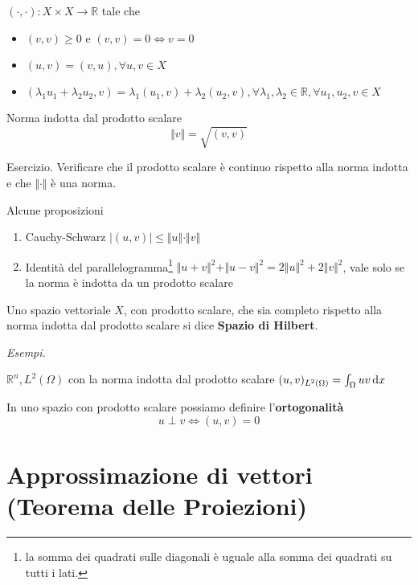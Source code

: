 \begin{definition}
     $(\cdotp,\cdotp) :X\times X\rightarrow \mathbb{R}$ tale che
    \begin{itemize}
        \item $(v,v) \geq 0$ e $(v,v) =0\Leftrightarrow v=0$
        \item $(u,v) =(v,u),\forall u,v\in X$
        \item $(\lambda _{1} u_{1} +\lambda _{2} u_{2},v) =\lambda _{1}(u_{1},v) +\lambda _{2}(u_{2},v),\forall \lambda _{1},\lambda _{2} \in \mathbb{R},\forall u_{1},u_{2},v\in X$
    \end{itemize}
\end{definition}
\begin{definition}
    Norma indotta dal prodotto scalare
    \begin{equation*}
        \Vert v\Vert =\sqrt{(v,v)}
    \end{equation*}
\end{definition}
Esercizio. Verificare che il prodotto scalare è continuo rispetto alla norma indotta e che $\Vert \cdotp \Vert $ è una norma.
\begin{theorem}
    Alcune proposizioni
    \begin{enumerate}
        \item Cauchy-Schwarz $| (u,v)| \leq \Vert u\Vert \cdotp \Vert v\Vert $
        \item Identità del parallelogramma\footnote{la somma dei quadrati sulle diagonali è uguale alla somma dei quadrati su tutti i lati.} $\Vert u+v\Vert ^{2} +\Vert u-v\Vert ^{2} =2\Vert u\Vert ^{2} +2\Vert v\Vert ^{2}$, vale solo se la norma è indotta da un prodotto scalare
    \end{enumerate}
\end{theorem}
\begin{definition}
    Uno spazio vettoriale $X$, con prodotto scalare, che sia completo rispetto alla norma indotta dal prodotto scalare si dice \textbf{Spazio di Hilbert}.
\end{definition}
\textit{Esempi.}

$\mathbb{R}^{n},L^{2}(\Omega)$ con la norma indotta dal prodotto scalare $(u,v)_{L^{2}(\Omega)} =\int _{\Omega } uv\,\mathrm d x$

In uno spazio con prodotto scalare possiamo definire l'\textbf{ortogonalità}
\begin{equation*}
    u\perp v\Leftrightarrow (u,v) =0
\end{equation*}
\section{Approssimazione di vettori (Teorema delle Proiezioni)}


